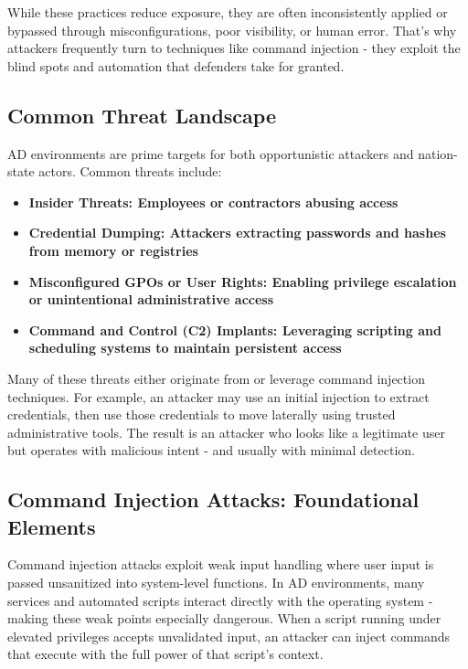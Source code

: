 While these practices reduce exposure, they are often inconsistently applied or bypassed through misconfigurations, poor visibility, or human error. That’s why attackers frequently turn to techniques like command injection - they exploit the blind spots and automation that defenders take for granted.

\subsection{Common Threat Landscape}

AD environments are prime targets for both opportunistic attackers and nation-state actors. Common threats include:

\begin{itemize}
    \item \textbf{\textbf{Insider Threats: }Employees or contractors abusing access}
    \item \textbf{\textbf{Credential Dumping: }Attackers extracting passwords and hashes from memory or registries}
    \item \textbf{\textbf{Misconfigured GPOs or User Rights: }Enabling privilege escalation or unintentional administrative access}
    \item \textbf{\textbf{Command and Control (C2) Implants: }Leveraging scripting and scheduling systems to maintain persistent access}
\end{itemize}

Many of these threats either originate from or leverage command injection techniques. For example, an attacker may use an initial injection to extract credentials, then use those credentials to move laterally using trusted administrative tools. The result is an attacker who looks like a legitimate user but operates with malicious intent - and usually with minimal detection.

\subsection{Command Injection Attacks: Foundational Elements}

Command injection attacks exploit weak input handling where user input is passed unsanitized into system-level functions. In AD environments, many services and automated scripts interact directly with the operating system - making these weak points especially dangerous. When a script running under elevated privileges accepts unvalidated input, an attacker can inject commands that execute with the full power of that script’s context.

